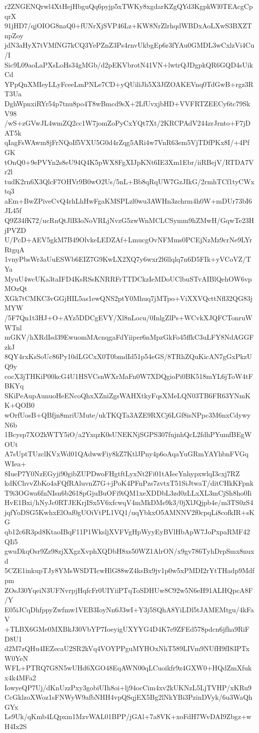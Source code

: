 r2ZNGENQrwl4XtHejHbguQq6pyjp5xTWKy8xgdarKZgQYd3KgpkWl0TEAcgCpqrX
91jHD7/qjOIOG8naQ0+fUNrXjSVP46Lz+KW8NrZlrhqdWBDxAoLXwS3BXZTnpZoy
jdN3aHyX7tVMfNG7kCQ3YePZnZ3Ps4rnvUkbgEp6r3fYAu0GMDL3wCxlzVi4Cu/I
Sic9L09aoLaPXsLoHs34gMGb/d2pEKVbrotN41VN+lwtrQJDgpkQR6GQD4sUikCd
YPpQnXMIeyLLyFceeLmPNLe7CD+yQUiliJh5X3JfZOAKEVnq0TdGwB+rgz3RT3Ua
DghWpnxiRYr54p7tnu8po4T8wBmcd9sX+2LfUvxjbHD+VVFRTZEECy6tc79SkV98
/wS+zGVwJL4wmZQ2cc1W7jomZoPyCxYQt7Xt/2KRCPAdV244zrJrnto+F7jDAT5k
qIagFsWAwm8jFrNQoIf5VXU5G0d4rZqg5ARi4w7VnR63em5VjTDfPKx8I/+4PfGK
tOnQ0+9ePVYn2s8eU94Q4K5pWX8FgXIJpKNt6IE3Xm1Ebr/iiRBejV/RTDA7Vr2l
tudK2rn6X3QlcF7OHVr9B0wO2Us/5nL+Bb8qRqUW7GzJIkG/2rmhTCf1tyCWxtq3
aEm+BwZPiveCvQ4rhLhHwFgaKMSPLzl0wu3AWHn3zchrm4h0W+mDUr73bI6JL45f
Q9Z34fK72/ucRnQtJlB3oNoVRLjNvzG5zwWnMCLCSymm9hZMwH/GqwTe23HjPVZD
U/PcD+AEV5gkM7B49OlvkeLEDZAf+LmucgOvNFMms0PCEjNzMz9crNe9LYrRtgqA
1vnyPbsWr3aUuESWb6EIZ7G9KwLX2XQ7y6wxr2l6llqlq7n6D5FIk+yVCoVZ/TYa
MyuU4wcUKa3taIFD4KsRSsKNRRFrTTDCkzIeMDoUClbuSTvAIBlQehOW6vpMOzQt
XGk7tCMKC3vGGjHIL5as1ewQNS2ptY0Mhuq7jMTpo+ViXXVQcttNfl32QG83jMYW
/5F7Qn1t3HJ+O+AYz5DDCgEVY/Xl8nLocu/0InlgZlPs+WCvkXJQFCTonruWWTnl
mGKV/hXRdIsd39EwuomMAcnqgaFdYiiper6nMpzGkFo45ffkC3uLFY8NdAGGFzkJ
8QY4rxKsSoUc86Py10dLGCxX0T0bmdId51p54eGS/8TRhZQuKicAN7gGxPkzUQ9y
cocX3jTHKiP00kcG4U1HSVCsnWXrMaFn0W7XDQgioPi0BK518mYL6jToW4tFBKYq
SKiPeAupAunuoHeENcoQhxXZniZgsWAHXtkyFqsXMeLQN03TB6FR63YNmKK+QOB0
wOrfUosB+QBfjn8mriUMute/ukTKQTa3AZE9RXCj6LGf8isNPpc3M6nxCdywyN6b
1Bcysp7XO2kWTY5iO/a2YxqzK0sUNEKNjSGPS307fujnhQcL2fdhPYumfBEgWOUt
A7sUptTUzclKVxWd01QAdwwFiy8kZ7KtlJPny4p6oAqaYuGRmYAYhbnFVGqWIea+
8IueP7Y0NzEGyji90gibZUPDwoFHgtftLyxNt2Fi01tAIecYnhypxwlqI3cxj7RZ
kdKChvvZbKo4aFQfRAluvnZ7G+jPoK4PFnPzs7zvtxT51SiJtwaT/ditCHkKFpnk
T9i3OGwa6fnNIsn6b2618pGjuBuOFi9iQM1xeXDDbL3zd0zLLxXL3mCjSh8ho0Ii
HvE1Bxi/hNyJc0RTJEKrjISx5V6xfcwqV4mMkDMe9k3/0jXlJQjpb4e/m3TS0zS4
jqfYoDSG5KwhxElOaf0gUOiVtPL1VQ1/uqYbkxO5AMNNV2f0cpqLi8cofkIR+sKG
qb12c6R3pd8KtaoIBqF11P1WksljXVFVgHpWyyEyBVlHbApW7JoPxpaRMF42QIi5
gwuDkqOsr9Zz98zjXXgzXvphXQDbH8xs50WZ1AlrON/x9gv786TyhDrpSmx8nuxd
5CZE1inkupTJy8YMsWSDTIcwHlG88wZ4ksBx9jv1p0w5xPMDI2rYtTHadp9Mdfpm
ZOsJ30YqeiN3UFNvrpjHqfcFr0UIYiiPTqToSDHUw8C92w5N6eH91ALHQpcA8F/Y
E05iJCqDhfppyZwfmw1VEB3IoyNn6J3wI+Y3j5SQhA8YiLDl5tJAMEMtgu/4kFaV
+TLBX6GMe0MXBkJ30VbYP7IoeyigUXYYG4D4K7e9ZFEd578pdcn6jfha9RiFD8U1
d2M7zQHu4IEZecaU2SR2kVq4VOYPPguMYHOxNhT589LIVm9NUfH9fI83PTxW0YeN
WFL+PTRQ7G8N5wUHd6XGO48EqAWN00qLCuoikfr9z4GXW0+HQdZmXfukx4k4MFa2
IowyeQP7Uj/dKnUzzPxy3gobiUIh8oi+lj94ocCim4xv2kUKNzL5LjTVHP/xKRu9
CcGklzoXWoz1sFNWyW9afbNHH4vpQSqjEX5Bg2lNkYBi3PzinDVyk/6u3WaQhGYx
Ls9Uk/qKmb4LQpxm1MzvWAL01BPP/jGAl+7a8VK+xoFdH7WvDAI9Zbgz+wH4Ix2S
